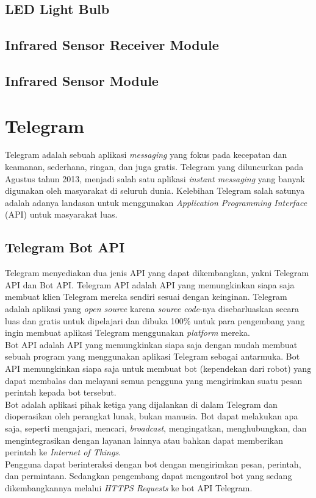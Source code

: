 \subsection{LED Light Bulb}
\subsection{Infrared Sensor Receiver Module}

\subsection{Infrared Sensor Module}

\section{Telegram}
\tab Telegram adalah sebuah aplikasi \textit{messaging} yang fokus pada kecepatan dan keamanan, sederhana, ringan, dan juga gratis. Telegram yang diluncurkan pada Agustus tahun 2013, menjadi salah satu aplikasi \textit{instant messaging} yang banyak digunakan oleh masyarakat di seluruh dunia. Kelebihan Telegram salah satunya adalah adanya landasan untuk menggunakan \textit{Application Programming Interface} (API) untuk
masyarakat luas.

\subsection{Telegram Bot API}
\tab Telegram menyediakan dua jenis API yang dapat dikembangkan, yakni  Telegram API dan Bot API. Telegram API adalah API yang memungkinkan siapa saja membuat klien Telegram mereka sendiri sesuai dengan keinginan. Telegram adalah aplikasi yang \textit{open source} karena \textit{source code}-nya disebarluaskan secara luas dan gratis untuk dipelajari dan dibuka 100\% untuk para pengembang yang ingin membuat aplikasi Telegram menggunakan \textit{platform} mereka. \\
\tab Bot API adalah API yang memungkinkan siapa saja dengan mudah membuat sebuah program yang menggunakan aplikasi Telegram sebagai antarmuka. Bot API memungkinkan siapa saja untuk membuat bot (kependekan dari robot) yang dapat membalas dan melayani semua pengguna yang mengirimkan suatu pesan perintah kepada bot tersebut. \\
\tab Bot adalah aplikasi pihak ketiga yang dijalankan di dalam Telegram dan dioperasikan oleh perangkat lunak, bukan manusia. Bot dapat melakukan apa saja, seperti mengajari, mencari, \textit{broadcast}, mengingatkan, menghubungkan, dan mengintegrasikan dengan layanan lainnya atau bahkan dapat memberikan perintah ke \textit{Internet of Things}.\\
\tab Pengguna dapat berinteraksi dengan bot dengan mengirimkan pesan, perintah, dan permintaan. Sedangkan pengembang dapat mengontrol bot yang sedang dikembangkannya melalui \textit{HTTPS Requests} ke bot API Telegram.

